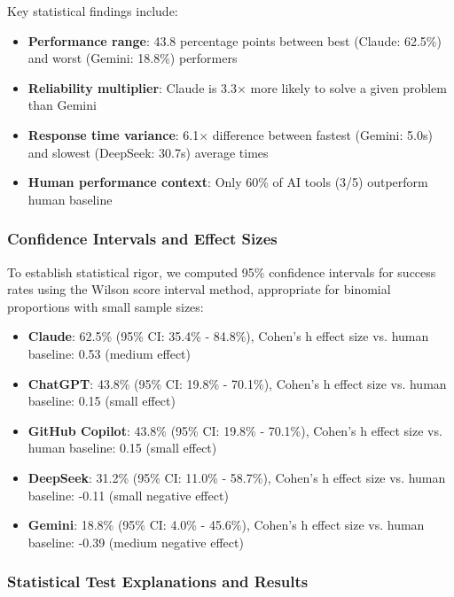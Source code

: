 \documentclass[conference]{IEEEtran}
\begin{document}
Key statistical findings include:

\begin{itemize}
    \item \textbf{Performance range}: 43.8 percentage points between best (Claude: 62.5\%) and worst (Gemini: 18.8\%) performers
    \item \textbf{Reliability multiplier}: Claude is 3.3× more likely to solve a given problem than Gemini
    \item \textbf{Response time variance}: 6.1× difference between fastest (Gemini: 5.0s) and slowest (DeepSeek: 30.7s) average times
    \item \textbf{Human performance context}: Only 60\% of AI tools (3/5) outperform human baseline
\end{itemize}

\subsubsection{Confidence Intervals and Effect Sizes}

To establish statistical rigor, we computed 95\% confidence intervals for success rates using the Wilson score interval method, appropriate for binomial proportions with small sample sizes:

\begin{itemize}
    \item \textbf{Claude}: 62.5\% (95\% CI: 35.4\% - 84.8\%), Cohen's h effect size vs. human baseline: 0.53 (medium effect)
    \item \textbf{ChatGPT}: 43.8\% (95\% CI: 19.8\% - 70.1\%), Cohen's h effect size vs. human baseline: 0.15 (small effect)
    \item \textbf{GitHub Copilot}: 43.8\% (95\% CI: 19.8\% - 70.1\%), Cohen's h effect size vs. human baseline: 0.15 (small effect)
    \item \textbf{DeepSeek}: 31.2\% (95\% CI: 11.0\% - 58.7\%), Cohen's h effect size vs. human baseline: -0.11 (small negative effect)
    \item \textbf{Gemini}: 18.8\% (95\% CI: 4.0\% - 45.6\%), Cohen's h effect size vs. human baseline: -0.39 (medium negative effect)
\end{itemize}

\subsubsection{Statistical Test Explanations and Results}
\end{document}
